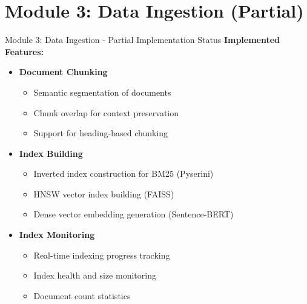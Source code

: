 \documentclass[aspectratio=169,xcolor=dvipsnames]{beamer}
\begin{document}
\section{Module 3: Data Ingestion (Partial)}

\begin{frame}{Module 3: Data Ingestion - Partial Implementation Status}
    \large
    \textbf{Implemented Features:}
    \begin{itemize}
        \item \checkmark \textbf{Document Chunking}
        \begin{itemize}
            \normalsize
            \item Semantic segmentation of documents
            \item Chunk overlap for context preservation
            \item Support for heading-based chunking
        \end{itemize}
        
        \vspace{0.5em}
        \item \checkmark \textbf{Index Building}
        \begin{itemize}
            \normalsize
            \item Inverted index construction for BM25 (Pyserini)
            \item HNSW vector index building (FAISS)
            \item Dense vector embedding generation (Sentence-BERT)
        \end{itemize}
        
        \vspace{0.5em}
        \item \checkmark \textbf{Index Monitoring}
        \begin{itemize}
            \normalsize
            \item Real-time indexing progress tracking
            \item Index health and size monitoring
            \item Document count statistics
        \end{itemize}
    \end{itemize}
\end{frame}
\end{document}
